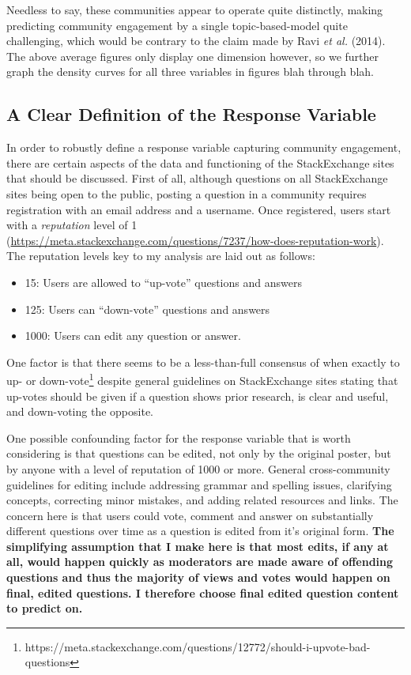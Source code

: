 \documentclass[11pt,preprint, authoryear]{article}
\numberwithin{equation}{section}
\let\rmarkdownfootnote\footnote%
\def\footnote{\protect\rmarkdownfootnote}
\begin{document}
Needless to say, these communities appear to operate quite distinctly,
making predicting community engagement by a single topic-based-model
quite challenging, which would be contrary to the claim made by Ravi
\emph{et al.} (2014). The above average figures only display one
dimension however, so we further graph the density curves for all three
variables in figures blah through blah.

\subsection{A Clear Definition of the Response
Variable}\label{a-clear-definition-of-the-response-variable}

In order to robustly define a response variable capturing community
engagement, there are certain aspects of the data and functioning of the
StackExchange sites that should be discussed. First of all, although
questions on all StackExchange sites being open to the public, posting a
question in a community requires registration with an email address and
a username. Once registered, users start with a \emph{reputation} level
of 1
(\url{https://meta.stackexchange.com/questions/7237/how-does-reputation-work}).
The reputation levels key to my analysis are laid out as follows:


\begin{itemize}
\item
  15: Users are allowed to ``up-vote'' questions and answers
\item
  125: Users can ``down-vote'' questions and answers
\item
  1000: Users can edit any question or answer.
\end{itemize}


One factor is that there seems to be a less-than-full consensus of when
exactly to up- or
down-vote\footnote{https://meta.stackexchange.com/questions/12772/should-i-upvote-bad-questions}
despite general guidelines on StackExchange sites stating that up-votes
should be given if a question shows prior research, is clear and useful,
and down-voting the opposite.

One possible confounding factor for the response variable that is worth
considering is that questions can be edited, not only by the original
poster, but by anyone with a level of reputation of 1000 or more.
General cross-community guidelines for editing include addressing
grammar and spelling issues, clarifying concepts, correcting minor
mistakes, and adding related resources and links. The concern here is
that users could vote, comment and answer on substantially different
questions over time as a question is edited from it's original form.
\textbf{The simplifying assumption that I make here is that most edits,
if any at all, would happen quickly as moderators are made aware of
offending questions and thus the majority of views and votes would
happen on final, edited questions. I therefore choose final edited
question content to predict on.}
\end{document}
